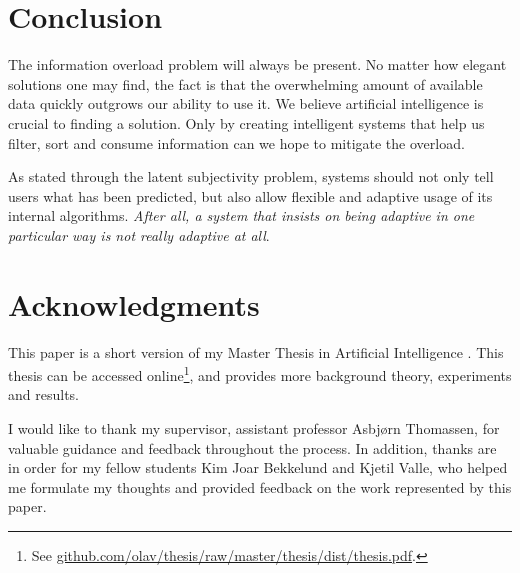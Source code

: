 \section{Conclusion}
\label{sec:conclusion}

The information overload problem will always be present.
No matter how elegant solutions one may find,
the fact is that the overwhelming amount of available data
quickly outgrows our ability to use it.
We believe artificial intelligence is crucial to finding a solution.
Only by creating intelligent systems that 
help us filter, sort and consume information can we hope 
to mitigate the overload.

As stated through the latent subjectivity problem,
systems should not only tell users what has been predicted,
but also allow flexible and adaptive usage of its internal algorithms.
\emph{After all, a system that insists on being adaptive
in one particular way is not really adaptive at all}.


\section*{Acknowledgments}
\label{sec:method}

This paper is a short version of my Master Thesis in Artificial Intelligence
\cite{Bjorkoy2011}.
This thesis can be accessed 
online\footnote{See \url{github.com/olav/thesis/raw/master/thesis/dist/thesis.pdf}.},
and provides more background theory, 
experiments and results.

I would like to thank my supervisor, assistant professor Asbjørn Thomassen, for valuable guidance and feedback throughout the process.
In addition, thanks are in order for my fellow students 
Kim Joar Bekkelund and Kjetil Valle,
who helped me formulate my thoughts and provided feedback on the work represented by this paper.


